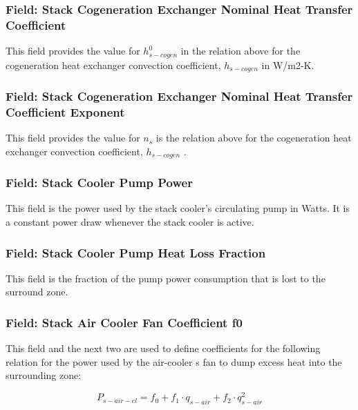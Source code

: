 \subsubsection{Field: Stack Cogeneration Exchanger Nominal Heat Transfer Coefficient}\label{field-stack-cogeneration-exchanger-nominal-heat-transfer-coefficient}

This field provides the value for \(h_{s - cogen}^0\) in the relation above for the cogeneration heat exchanger convection coefficient, \({h_{s - cogen}}\) in W/m2-K.

\subsubsection{Field: Stack Cogeneration Exchanger Nominal Heat Transfer Coefficient Exponent}\label{field-stack-cogeneration-exchanger-nominal-heat-transfer-coefficient-exponent}

This field provides the value for \({n_s}\) is the relation above for the cogeneration heat exchanger convection coefficient, \({h_{s - cogen}}\) .

\subsubsection{Field: Stack Cooler Pump Power}\label{field-stack-cooler-pump-power}

This field is the power used by the stack cooler's circulating pump in Watts. It is a constant power draw whenever the stack cooler is active.

\subsubsection{Field: Stack Cooler Pump Heat Loss Fraction}\label{field-stack-cooler-pump-heat-loss}

This field is the fraction of the pump power consumption that is lost to the surround zone.

\subsubsection{Field: Stack Air Cooler Fan Coefficient f0}\label{field-stack-air-cooler-fan-coefficient-f0}

This field and the next two are used to define coefficients for the following relation for the power used by the air-cooler s fan to dump excess heat into the surrounding zone:

\begin{equation}
{P_{s - air - el}} = {f_0} + {f_1} \cdot {q_{s - air}} + {f_2} \cdot q_{s - air}^2
\end{equation}

